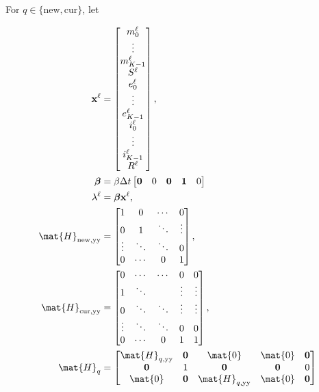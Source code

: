 \documentclass{jpmarticle}
\renewcommand{\vec}[1]{\boldsymbol{\mathrm{#1}}}
\let\subequationsorig\subequations%
\let\endsubequationsorig\endsubequations%
\renewenvironment{subequations}{
  \subequationsorig
  \renewcommand{\theequation}{\theparentequation.\arabic{equation}}
}{
  \endsubequationsorig
}
\begin{document}
For $q \in \{\mathrm{new}, \mathrm{cur}\}$, let
\begin{subequations}
  \begin{align}
    \vec{x}^{\ell} &=
    \begin{bmatrix}
      m_0^{\ell} \\ \vdots \\ m_{K - 1}^{\ell} \\
      S^{\ell} \\
      e_0^{\ell} \\ \vdots \\ e_{K - 1}^{\ell} \\
      i_0^{\ell} \\ \vdots \\ i_{K - 1}^{\ell} \\
      R^{\ell}
    \end{bmatrix},
    \\
    \vec{\beta} &=
    \beta \Delta t
    \begin{bmatrix}
      \vec{0} & 0 & \vec{0} & \vec{1} & 0
    \end{bmatrix}
    \\
    \lambda^{\ell} &=
    \vec{\beta} \vec{x}^{\ell},
    \\
    \mat{H}_{\mathrm{new}, \mathrm{yy}} &=
    \begin{bmatrix}
      1 & 0 & \cdots & 0 \\
      0 & 1 & \ddots & \vdots \\
      \vdots & \ddots & \ddots & 0 \\
      0 & \cdots & 0 & 1
    \end{bmatrix},
    \\
    \mat{H}_{\mathrm{cur}, \mathrm{yy}} &=
    \begin{bmatrix}
      0 & \cdots & \cdots & 0 & 0 \\
      1 & \ddots & & \vdots & \vdots \\
      0 & \ddots & \ddots & \vdots & \vdots \\
      \vdots & \ddots & \ddots & 0 & 0 \\
      0 & \cdots & 0 & 1 & 1
    \end{bmatrix},
    \\
    \mat{H}_{q} &=
    \begin{bmatrix}
      \mat{H}_{q, \mathrm{yy}} & \vec{0} & \mat{0} & \mat{0} & \vec{0} \\
      \vec{0} & 1 & \vec{0} & \vec{0} & 0 \\
      \mat{0} & \vec{0} & \mat{H}_{q, \mathrm{yy}} & \mat{0} & \vec{0} \\

\end{bmatrix}
\end{align}
\end{subequations}
\end{document}
